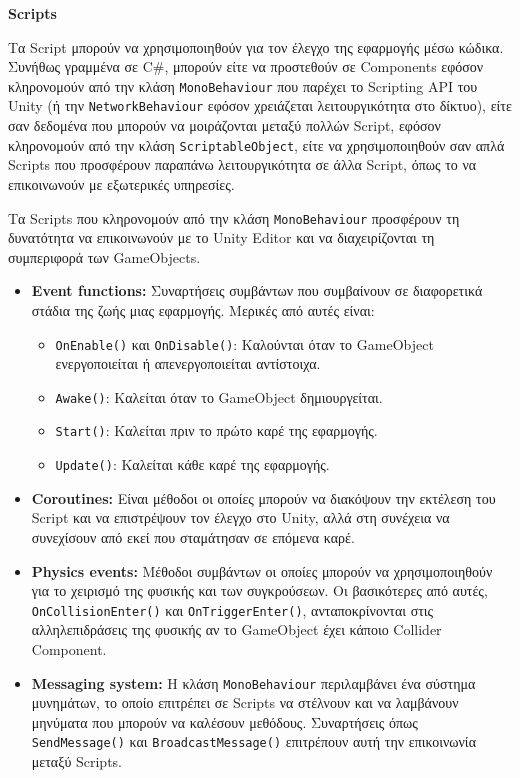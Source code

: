 \textbf{Scripts}

Τα Script μπορούν να χρησιμοποιηθούν για τον έλεγχο της εφαρμογής μέσω κώδικα. Συνήθως γραμμένα σε C\#, μπορούν είτε να προστεθούν σε Components εφόσον κληρονομούν από την κλάση \verb|MonoBehaviour| που παρέχει το Scripting API του Unity (ή την \verb|NetworkBehaviour| εφόσον χρειάζεται λειτουργικότητα στο δίκτυο), είτε σαν δεδομένα που μπορούν να μοιράζονται μεταξύ πολλών Script, εφόσον κληρονομούν από την κλάση \verb|ScriptableObject|, είτε να χρησιμοποιηθούν σαν απλά Scripts που προσφέρουν παραπάνω λειτουργικότητα σε άλλα Script, όπως το να επικοινωνούν με εξωτερικές υπηρεσίες.

Τα Scripts που κληρονομούν από την κλάση \verb|MonoBehaviour| προσφέρουν τη δυνατότητα να επικοινωνούν με το Unity Editor και να διαχειρίζονται τη συμπεριφορά των GameObjects.
\begin{itemize}
    \item \textbf{Event functions:} Συναρτήσεις συμβάντων που συμβαίνουν σε διαφορετικά στάδια της ζωής μιας εφαρμογής. Μερικές από αυτές είναι:
    \begin{itemize}
        \item \verb|OnEnable()| και \verb|OnDisable()|: Καλούνται όταν το GameObject ενεργοποιείται ή απενεργοποιείται αντίστοιχα.
        \item \verb|Awake()|: Καλείται όταν το GameObject δημιουργείται.
        \item \verb|Start()|: Καλείται πριν το πρώτο καρέ της εφαρμογής.
        \item \verb|Update()|: Καλείται κάθε καρέ της εφαρμογής.
    \end{itemize}
    \item \textbf{Coroutines:} Είναι μέθοδοι οι οποίες μπορούν να διακόψουν την εκτέλεση του Script και να επιστρέψουν τον έλεγχο στο Unity, αλλά στη συνέχεια να συνεχίσουν από εκεί που σταμάτησαν σε επόμενα καρέ.
    \item \textbf{Physics events:} Μέθοδοι συμβάντων οι οποίες μπορούν να χρησιμοποιηθούν για το χειρισμό της φυσικής και των συγκρούσεων. Οι βασικότερες από αυτές, \verb|OnCollisionEnter()| και \verb|OnTriggerEnter()|, ανταποκρίνονται στις αλληλεπιδράσεις της φυσικής αν το GameObject έχει κάποιο Collider Component.
    \item \textbf{Messaging system:} Η κλάση \verb|MonoBehaviour| περιλαμβάνει ένα σύστημα μυνημάτων, το οποίο επιτρέπει σε Scripts να στέλνουν και να λαμβάνουν μηνύματα που μπορούν να καλέσουν μεθόδους. Συναρτήσεις όπως \verb|SendMessage()| και \verb|BroadcastMessage()| επιτρέπουν αυτή την επικοινωνία μεταξύ Scripts.

\end{itemize}
